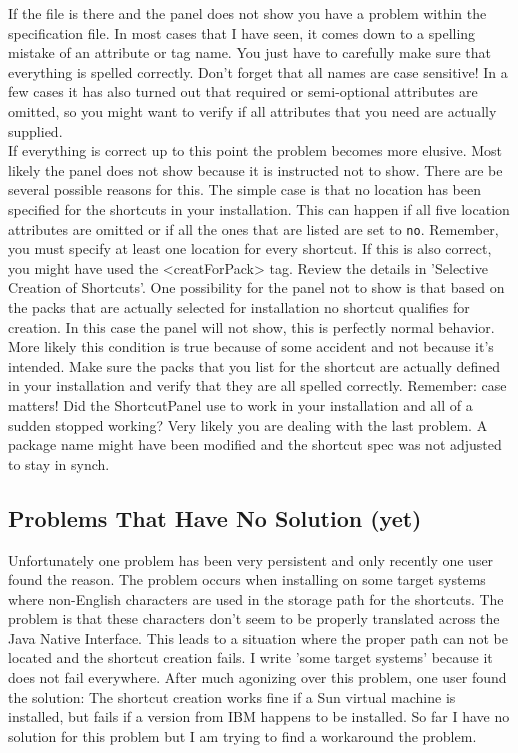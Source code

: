 If the file is there and the panel does not show you have a problem
within the specification file. In most cases that I have seen, it comes
down to a spelling mistake of an attribute or tag name. You just have to
carefully make sure that everything is spelled correctly. Don't forget
that all names are case sensitive! In a few cases it has also turned out
that required or semi-optional attributes are omitted, so you might want
to verify if all attributes that you need are actually supplied.\\

If everything is correct up to this point the problem becomes more
elusive.  Most likely the panel does not show because it is instructed
not to show. There are be several possible reasons for this. The simple
case is that no location has been specified for the shortcuts in your
installation. This can happen if all five location attributes are
omitted or if all the ones that are listed are set to \texttt{no}.
Remember, you must specify at least one location for every shortcut. If
this is also correct, you might have used the <creatForPack> tag. Review
the details in 'Selective Creation of Shortcuts'. One possibility for
the panel not to show is that based on the packs that are actually
selected for installation no shortcut qualifies for creation. In this
case the panel will not show, this is perfectly normal behavior. More
likely this condition is true because of some accident and not because
it's intended. Make sure the packs that you list for the shortcut are
actually defined in your installation and verify that they are all
spelled correctly. Remember: case matters! Did the ShortcutPanel use to
work in your installation and all of a sudden stopped working? Very
likely you are dealing with the last problem. A package name might have
been modified and the shortcut spec was not adjusted to stay in synch.\\

\subsection{Problems That Have No Solution (yet)}

Unfortunately one problem has been very persistent and only recently one
user found the reason. The problem occurs when installing on some target
systems where non-English characters are used in the storage path for
the shortcuts. The problem is that these characters don't seem to be
properly translated across the Java Native Interface. This leads to a
situation where the proper path can not be located and the shortcut
creation fails. I write 'some target systems' because it does not fail
everywhere. After much agonizing over this problem, one user found the
solution: The shortcut creation works fine if a Sun virtual machine is
installed, but fails if a version from IBM happens to be installed. So
far I have no solution for this problem but I am trying to find a
workaround the problem.\\